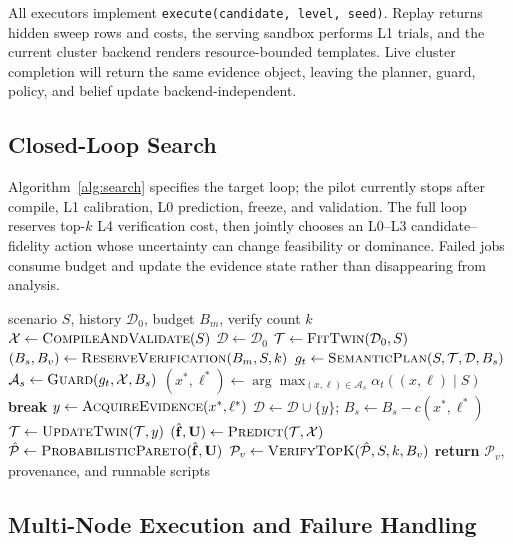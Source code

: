 All executors implement \texttt{execute(candidate, level, seed)}.  Replay
returns hidden sweep rows and costs, the serving sandbox performs L1 trials,
and the current cluster backend renders resource-bounded templates.  Live
cluster completion will return the same evidence object, leaving the planner,
guard, policy, and belief update backend-independent.

\subsection{Closed-Loop Search}

Algorithm~\ref{alg:search} specifies the target loop; the pilot currently stops
after compile, L1 calibration, L0 prediction, freeze, and validation.  The full
loop reserves top-$k$ L4 verification cost, then jointly chooses an L0--L3
candidate--fidelity action whose uncertainty can change feasibility or
dominance.  Failed jobs consume budget and update the evidence state rather
than disappearing from analysis.

\begin{algorithm}[t]
\caption{Agentic multi-fidelity Pareto search}
\label{alg:search}
\footnotesize
\begin{algorithmic}[1]
\REQUIRE scenario $S$, history $\mathcal D_0$, budget $B_m$, verify count $k$
\STATE $\mathcal X\gets\textsc{CompileAndValidate}(S)$
\STATE $\mathcal D\gets\mathcal D_0$
\STATE $\mathcal T\gets\textsc{FitTwin}(\mathcal D_0,S)$
\STATE $(B_s,B_v)\gets\textsc{ReserveVerification}(B_m,S,k)$
  \STATE $g_t\gets\textsc{SemanticPlan}(S,\mathcal T,\mathcal D,B_s)$
  \STATE $\mathcal A_s\gets\textsc{Guard}(g_t,\mathcal X,B_s)$
  \STATE $(x^*,\ell^*)\gets\arg\max_{(x,\ell)\in\mathcal A_s}
  \alpha_t((x,\ell)\mid S)$
    \STATE \textbf{break}
  \ENDIF
  \STATE $y\gets\textsc{AcquireEvidence}(x^*,\ell^*)$
  \STATE $\mathcal D\gets\mathcal D\cup\{y\}$; $B_s\gets B_s-c(x^*,\ell^*)$
  \STATE $\mathcal T\gets\textsc{UpdateTwin}(\mathcal T,y)$
\ENDWHILE
\STATE $(\hat{\mathbf f},\mathbf U)\gets\textsc{Predict}(\mathcal T,\mathcal X)$
\STATE $\hat{\mathcal P}\gets\textsc{ProbabilisticPareto}(\hat{\mathbf f},\mathbf U)$
\STATE $\mathcal P_v\gets\textsc{VerifyTopK}(\hat{\mathcal P},S,k,B_v)$
\STATE \textbf{return} $\mathcal P_v$, provenance, and runnable scripts
\end{algorithmic}
\end{algorithm}

\subsection{Multi-Node Execution and Failure Handling}

